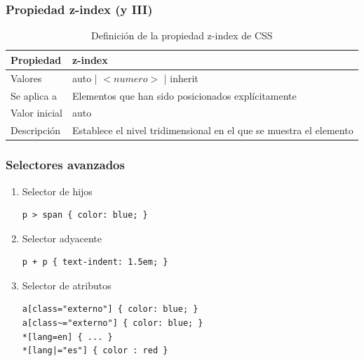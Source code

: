 \begin{frame}
\frametitle{Propiedad z-index (y III)}

\begin{center}
  \begin{table}
   \begin{tabular}{p{1.8cm}p{7.8cm}}
Propiedad & \bf{z-index} \\ \hline
Valores& auto | $<numero>$ | inherit \\ \hline
Se aplica a& Elementos que han sido posicionados explícitamente \\ \hline
Valor inicial& auto \\ \hline
Descripción& Establece el nivel tridimensional en el que se muestra el elemento \\ \hline
  \end{tabular}
   \caption{Definición de la propiedad z-index de CSS}
 \end{table}
\end{center}


\end{frame}


\begin{frame}[fragile]
\frametitle{Selectores avanzados}

\begin{enumerate}
  \item Selector de hijos
\begin{verbatim}
p > span { color: blue; }
\end{verbatim}
  \item Selector adyacente
\begin{verbatim}
p + p { text-indent: 1.5em; }
\end{verbatim}
  \item Selector de atributos
\begin{verbatim}
a[class="externo"] { color: blue; }
a[class~="externo"] { color: blue; }
*[lang=en] { ... }
*[lang|="es"] { color : red }
\end{verbatim}
\end{enumerate}

\end{frame}




